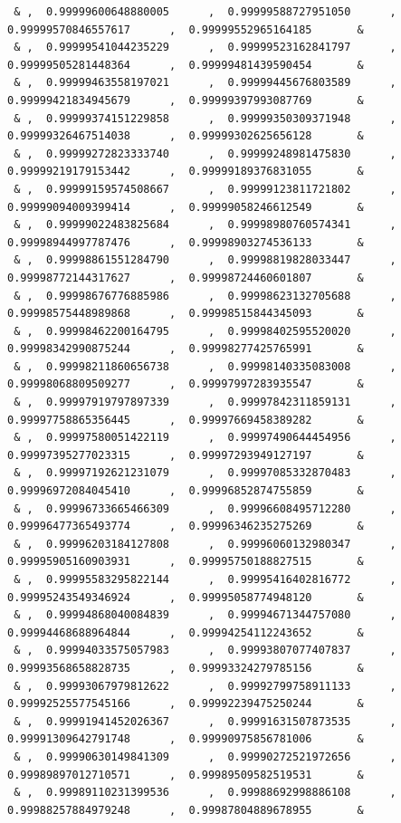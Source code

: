 \documentclass[a4paper,10pt]{report}
\begin{document}
{\begin{verbatim}
 & ,  0.99999600648880005      ,  0.99999588727951050      ,  0.99999570846557617      ,  0.99999552965164185       &
 & ,  0.99999541044235229      ,  0.99999523162841797      ,  0.99999505281448364      ,  0.99999481439590454       &
 & ,  0.99999463558197021      ,  0.99999445676803589      ,  0.99999421834945679      ,  0.99999397993087769       &
 & ,  0.99999374151229858      ,  0.99999350309371948      ,  0.99999326467514038      ,  0.99999302625656128       &
 & ,  0.99999272823333740      ,  0.99999248981475830      ,  0.99999219179153442      ,  0.99999189376831055       &
 & ,  0.99999159574508667      ,  0.99999123811721802      ,  0.99999094009399414      ,  0.99999058246612549       &
 & ,  0.99999022483825684      ,  0.99998980760574341      ,  0.99998944997787476      ,  0.99998903274536133       &
 & ,  0.99998861551284790      ,  0.99998819828033447      ,  0.99998772144317627      ,  0.99998724460601807       &
 & ,  0.99998676776885986      ,  0.99998623132705688      ,  0.99998575448989868      ,  0.99998515844345093       &
 & ,  0.99998462200164795      ,  0.99998402595520020      ,  0.99998342990875244      ,  0.99998277425765991       &
 & ,  0.99998211860656738      ,  0.99998140335083008      ,  0.99998068809509277      ,  0.99997997283935547       &
 & ,  0.99997919797897339      ,  0.99997842311859131      ,  0.99997758865356445      ,  0.99997669458389282       &
 & ,  0.99997580051422119      ,  0.99997490644454956      ,  0.99997395277023315      ,  0.99997293949127197       &
 & ,  0.99997192621231079      ,  0.99997085332870483      ,  0.99996972084045410      ,  0.99996852874755859       &
 & ,  0.99996733665466309      ,  0.99996608495712280      ,  0.99996477365493774      ,  0.99996346235275269       &
 & ,  0.99996203184127808      ,  0.99996060132980347      ,  0.99995905160903931      ,  0.99995750188827515       &
 & ,  0.99995583295822144      ,  0.99995416402816772      ,  0.99995243549346924      ,  0.99995058774948120       &
 & ,  0.99994868040084839      ,  0.99994671344757080      ,  0.99994468688964844      ,  0.99994254112243652       &
 & ,  0.99994033575057983      ,  0.99993807077407837      ,  0.99993568658828735      ,  0.99993324279785156       &
 & ,  0.99993067979812622      ,  0.99992799758911133      ,  0.99992525577545166      ,  0.99992239475250244       &
 & ,  0.99991941452026367      ,  0.99991631507873535      ,  0.99991309642791748      ,  0.99990975856781006       &
 & ,  0.99990630149841309      ,  0.99990272521972656      ,  0.99989897012710571      ,  0.99989509582519531       &
 & ,  0.99989110231399536      ,  0.99988692998886108      ,  0.99988257884979248      ,  0.99987804889678955       &

\end{verbatim}}
\end{document}
